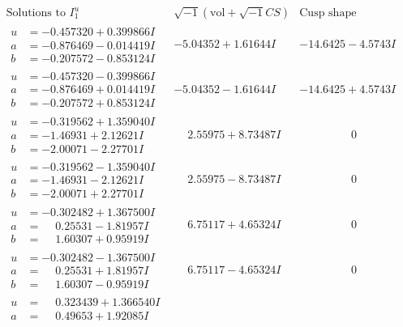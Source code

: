 \documentclass[1p]{elsarticle_modified}
\theoremstyle{definition}
\newcommand{\I}{\sqrt{-1}}
\begin{document}
$$\begin{array}{c|c|c}
\text{Solutions to }I^u_{1}& \I (\text{vol} + \sqrt{-1}CS) & \text{Cusp shape}\\
 \hline 
\begin{aligned}
u &= -0.457320 + 0.399866 I \\
a &= -0.876469 - 0.014419 I \\
b &= -0.207572 - 0.853124 I\end{aligned}
 & -5.04352 + 1.61644 I & -14.6425 - 4.5743 I \\ \hline\begin{aligned}
u &= -0.457320 - 0.399866 I \\
a &= -0.876469 + 0.014419 I \\
b &= -0.207572 + 0.853124 I\end{aligned}
 & -5.04352 - 1.61644 I & -14.6425 + 4.5743 I \\ \hline\begin{aligned}
u &= -0.319562 + 1.359040 I \\
a &= -1.46931 + 2.12621 I \\
b &= -2.00071 - 2.27701 I\end{aligned}
 & \phantom{-}2.55975 + 8.73487 I & \phantom{-0.000000 } 0 \\ \hline\begin{aligned}
u &= -0.319562 - 1.359040 I \\
a &= -1.46931 - 2.12621 I \\
b &= -2.00071 + 2.27701 I\end{aligned}
 & \phantom{-}2.55975 - 8.73487 I & \phantom{-0.000000 } 0 \\ \hline\begin{aligned}
u &= -0.302482 + 1.367500 I \\
a &= \phantom{-}0.25531 - 1.81957 I \\
b &= \phantom{-}1.60307 + 0.95919 I\end{aligned}
 & \phantom{-}6.75117 + 4.65324 I & \phantom{-0.000000 } 0 \\ \hline\begin{aligned}
u &= -0.302482 - 1.367500 I \\
a &= \phantom{-}0.25531 + 1.81957 I \\
b &= \phantom{-}1.60307 - 0.95919 I\end{aligned}
 & \phantom{-}6.75117 - 4.65324 I & \phantom{-0.000000 } 0 \\ \hline\begin{aligned}
u &= \phantom{-}0.323439 + 1.366540 I \\
a &= \phantom{-}0.49653 + 1.92085 I \\

\end{aligned}
\end{array}$$
\end{document}
